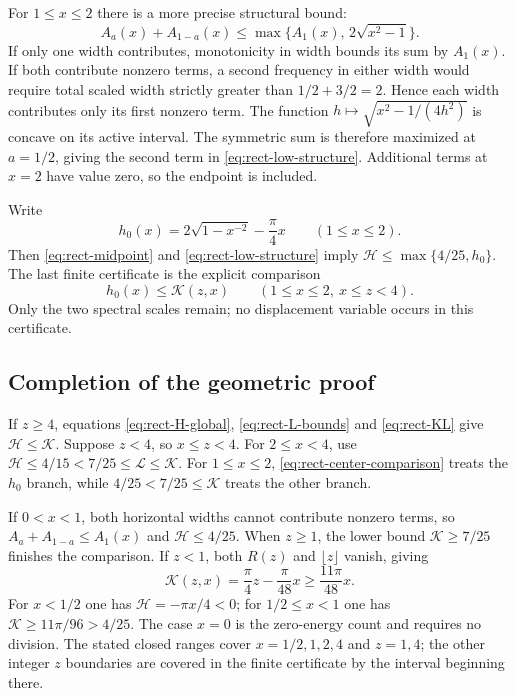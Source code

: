 \documentclass[11pt,reqno]{amsart}
\numberwithin{equation}{section}
\begin{document}
For $1\le x\le2$ there is a more precise structural bound:
\begin{equation}\label{eq:rect-low-structure}
 A_a(x)+A_{1-a}(x)
 \le\max\{A_1(x),\,2\sqrt{x^2-1}\}.
\end{equation}
If only one width contributes, monotonicity in width bounds its
sum by $A_1(x)$. If both contribute nonzero terms, a second
frequency in either width would require total scaled width
strictly greater than $1/2+3/2=2$. Hence each width contributes
only its first nonzero term. The function
$h\mapsto\sqrt{x^2-1/(4h^2)}$ is concave on its active
interval. The symmetric sum is therefore maximized at
$a=1/2$, giving the second term in
\eqref{eq:rect-low-structure}. Additional terms at $x=2$ have
value zero, so the endpoint is included.

Write
\[
 h_0(x)=2\sqrt{1-x^{-2}}-\frac\pi4x\qquad(1\le x\le2).
\]
Then \eqref{eq:rect-midpoint} and
\eqref{eq:rect-low-structure} imply
$\mathcal H\le\max\{4/25,h_0\}$. The last finite
certificate is the explicit comparison
\begin{equation}\label{eq:rect-center-comparison}
 h_0(x)\le\mathcal K(z,x)
 \qquad(1\le x\le2,\ x\le z<4).
\end{equation}
Only the two spectral scales remain; no displacement variable
occurs in this certificate.

\subsection*{Completion of the geometric proof}

If $z\ge4$, equations \eqref{eq:rect-H-global},
\eqref{eq:rect-L-bounds} and \eqref{eq:rect-KL} give
$\mathcal H\le\mathcal K$. Suppose $z<4$, so $x\le z<4$.
For $2\le x<4$, use $\mathcal H\le4/15<7/25\le
\mathcal L\le\mathcal K$. For $1\le x\le2$,
\eqref{eq:rect-center-comparison} treats the $h_0$ branch,
while $4/25<7/25\le\mathcal K$ treats the other branch.

If $0<x<1$, both horizontal widths cannot contribute nonzero
terms, so $A_a+A_{1-a}\le A_1(x)$ and
$\mathcal H\le4/25$. When $z\ge1$, the lower bound
$\mathcal K\ge7/25$ finishes the comparison. If $z<1$,
both $R(z)$ and $\lfloor z\rfloor$ vanish, giving
\[
 \mathcal K(z,x)=\frac\pi4z-\frac\pi{48}x
 \ge\frac{11\pi}{48}x.
\]
For $x<1/2$ one has $\mathcal H=-\pi x/4<0$; for
$1/2\le x<1$ one has $\mathcal K\ge11\pi/96>4/25$.
The case $x=0$ is the zero-energy count and requires no division.
The stated closed ranges cover $x=1/2,1,2,4$ and $z=1,4$;
the other integer $z$ boundaries are covered in the finite
certificate by the interval beginning there.
\end{document}
